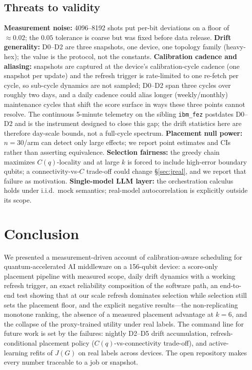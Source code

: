 \documentclass[journal,10pt,twocolumn]{IEEEtran}
\begin{document}
\subsection{Threats to validity}
\textbf{Measurement noise:} 4096--8192 shots put per-bit deviations on a floor of $\approx0.02$; the $0.05$
tolerance is coarse but was fixed before data release. \textbf{Drift generality:} D0--D2 are three snapshots, one
device, one topology family (heavy-hex); the value is the protocol, not the constants. \textbf{Calibration cadence
and aliasing:} snapshots are captured at the device's calibration-cycle cadence (one snapshot per update) and the
refresh trigger is rate-limited to one re-fetch per cycle, so sub-cycle dynamics are not sampled; D0--D2 span three
cycles over roughly two days, and a daily cadence could alias longer (weekly/monthly) maintenance cycles that shift
the score surface in ways these three points cannot resolve. The continuous 5-minute telemetry on the sibling
\texttt{ibm\_fez} postdates D0--D2 and is the instrument designed to close this gap; the drift statistics here are
therefore day-scale bounds, not a full-cycle spectrum. \textbf{Placement null
power:} $n{=}30$/arm can detect only large effects; we report point estimates and CIs rather than asserting
equivalence. \textbf{Selection fairness:} the greedy chain maximizes $C(q)$-locality and at large $k$ is forced to
include high-error boundary qubits; a connectivity-vs-$C$ trade-off could change \S\ref{sec:jreal}, and we report
that failure as motivation. \textbf{Single-model LLM layer:} the orchestration calculus holds under i.i.d.\ mock
semantics; real-model autocorrelation is explicitly outside its scope.

\section{Conclusion}
We presented a measurement-driven account of calibration-aware scheduling for quantum-accelerated AI middleware on
a 156-qubit device: a score-only placement pipeline with measured scope, daily drift dynamics with a working
refresh trigger, an exact reliability composition of the software path, an end-to-end test showing that at our
scale refresh dominates selection while selection still sets the placement floor, and the explicit negative
results---the non-replicating monotone ranking, the absence of a measured placement advantage at $k{=}6$, and the
collapse of the proxy-trained utility under real labels. The command line for future work is set by the failures:
nightly D2--D5 drift accumulation, refresh-conditional placement policy ($C(q)$-vs-connectivity trade-off), and
active-learning refits of $J(G)$ on real labels across devices. The open repository makes every number traceable to
a job or snapshot.
\end{document}
